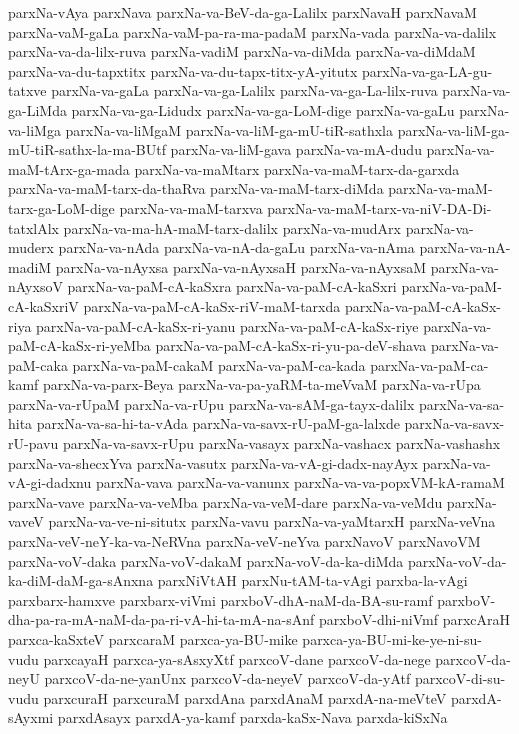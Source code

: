 {parxNa-vAya
parxNava
parxNa-va-BeV-da-ga-Lalilx
parxNavaH
parxNavaM
parxNa-vaM-gaLa
parxNa-vaM-pa-ra-ma-padaM
parxNa-vada
parxNa-va-dalilx
parxNa-va-da-lilx-ruva
parxNa-vadiM
parxNa-va-diMda
parxNa-va-diMdaM
parxNa-va-du-tapxtitx
parxNa-va-du-tapx-titx-yA-yitutx
parxNa-va-ga-LA-gu-tatxve
parxNa-va-gaLa
parxNa-va-ga-Lalilx
parxNa-va-ga-La-lilx-ruva
parxNa-va-ga-LiMda
parxNa-va-ga-Lidudx
parxNa-va-ga-LoM-dige
parxNa-va-gaLu
parxNa-va-liMga
parxNa-va-liMgaM
parxNa-va-liM-ga-mU-tiR-sathxla
parxNa-va-liM-ga-mU-tiR-sathx-la-ma-BUtf
parxNa-va-liM-gava
parxNa-va-mA-dudu
parxNa-va-maM-tArx-ga-mada
parxNa-va-maMtarx
parxNa-va-maM-tarx-da-garxda
parxNa-va-maM-tarx-da-thaRva
parxNa-va-maM-tarx-diMda
parxNa-va-maM-tarx-ga-LoM-dige
parxNa-va-maM-tarxva
parxNa-va-maM-tarx-va-niV-DA-Di-tatxlAlx
parxNa-va-ma-hA-maM-tarx-dalilx
parxNa-va-mudArx
parxNa-va-muderx
parxNa-va-nAda
parxNa-va-nA-da-gaLu
parxNa-va-nAma
parxNa-va-nA-madiM
parxNa-va-nAyxsa
parxNa-va-nAyxsaH
parxNa-va-nAyxsaM
parxNa-va-nAyxsoV
parxNa-va-paM-cA-kaSxra
parxNa-va-paM-cA-kaSxri
parxNa-va-paM-cA-kaSxriV
parxNa-va-paM-cA-kaSx-riV-maM-tarxda
parxNa-va-paM-cA-kaSx-riya
parxNa-va-paM-cA-kaSx-ri-yanu
parxNa-va-paM-cA-kaSx-riye
parxNa-va-paM-cA-kaSx-ri-yeMba
parxNa-va-paM-cA-kaSx-ri-yu-pa-deV-shava
parxNa-va-paM-caka
parxNa-va-paM-cakaM
parxNa-va-paM-ca-kada
parxNa-va-paM-ca-kamf
parxNa-va-parx-Beya
parxNa-va-pa-yaRM-ta-meVvaM
parxNa-va-rUpa
parxNa-va-rUpaM
parxNa-va-rUpu
parxNa-va-sAM-ga-tayx-dalilx
parxNa-va-sa-hita
parxNa-va-sa-hi-ta-vAda
parxNa-va-savx-rU-paM-ga-lalxde
parxNa-va-savx-rU-pavu
parxNa-va-savx-rUpu
parxNa-vasayx
parxNa-vashacx
parxNa-vashashx
parxNa-va-shecxYva
parxNa-vasutx
parxNa-va-vA-gi-dadx-nayAyx
parxNa-va-vA-gi-dadxnu
parxNa-vava
parxNa-va-vanunx
parxNa-va-va-popxVM-kA-ramaM
parxNa-vave
parxNa-va-veMba
parxNa-va-veM-dare
parxNa-va-veMdu
parxNa-vaveV
parxNa-va-ve-ni-situtx
parxNa-vavu
parxNa-va-yaMtarxH
parxNa-veVna
parxNa-veV-neY-ka-va-NeRVna
parxNa-veV-neYva
parxNavoV
parxNavoVM
parxNa-voV-daka
parxNa-voV-dakaM
parxNa-voV-da-ka-diMda
parxNa-voV-da-ka-diM-daM-ga-sAnxna
parxNiVtAH
parxNu-tAM-ta-vAgi
parxba-la-vAgi
parxbarx-hamxve
parxbarx-viVmi
parxboV-dhA-naM-da-BA-su-ramf
parxboV-dha-pa-ra-mA-naM-da-pa-ri-vA-hi-ta-mA-na-sAnf
parxboV-dhi-niVmf
parxcAraH
parxca-kaSxteV
parxcaraM
parxca-ya-BU-mike
parxca-ya-BU-mi-ke-ye-ni-su-vudu
parxcayaH
parxca-ya-sAsxyXtf
parxcoV-dane
parxcoV-da-nege
parxcoV-da-neyU
parxcoV-da-ne-yanUnx
parxcoV-da-neyeV
parxcoV-da-yAtf
parxcoV-di-su-vudu
parxcuraH
parxcuraM
parxdAna
parxdAnaM
parxdA-na-meVteV
parxdA-sAyxmi
parxdAsayx
parxdA-ya-kamf
parxda-kaSx-Nava
parxda-kiSxNa
}
